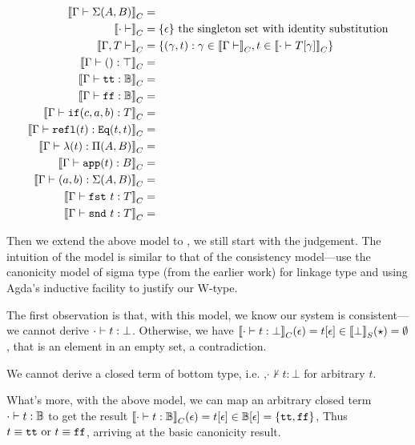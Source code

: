 \begin{align*}
  \denotesC{\goodType{\Gm}{\TySigma{A}{B}}{}} &= \\
  \denotesC{\goodCtx{\cdot}{}} &= \{\SubstEmp\} \text{  the singleton set with identity substitution} \\ 
  \denotesC{\goodCtx{\Gm, T}{}} &= \{ (\gamma , t) : \gamma \in \denotesC{\goodCtx{\Gm}{}}, t \in \denotesC{\goodType{\cdot}{\sub{T}{\gm}}{}}  \} \\
  \denotesC{\goodTerm{\Gm}{\unit}{\top}} &= \\
  \denotesC{\goodTerm{\Gm}{\true}{\cB}} &= \\
  \denotesC{\goodTerm{\Gm}{\false}{\cB}} &= \\
  \denotesC{\goodTerm{\Gm}{\ifb{c}{a}{b}}{T}} &= \\
  \denotesC{\goodTerm{\Gm}{\eqrefl{t}}{\TyId{t}{t}}} &= \\
  \denotesC{\goodTerm{\Gm}{\lam{t}}{\TyPi{A}{B}}} &= \\
  \denotesC{\goodTerm{\Gm}{\app{t}}{B}} &= \\
  \denotesC{\goodTerm{\Gm}{\pair{a}{b}}{\TySigma{A}{B}}} &= \\
  \denotesC{\goodTerm{\Gm}{\fst{t}}{T}} &= \\
  \denotesC{\goodTerm{\Gm}{\snd{t}}{T}} &= \\
\end{align*}

Then we extend the above model to \TT , we still start with the judgement.
The intuition of the model is similar to that of the consistency model---use the canonicity model of sigma type (from the earlier work) for linkage type and using Agda's inductive facility to justify our W-type. 

The first observation is that, with this model, we know our system is consistent---we cannot derive $\goodTerm{\cdot}{t}{\bot}$. Otherwise, we have $\denotesC{\goodTerm{\cdot}{t}{\bot}}(\SubstEmp) = \sub{t}{\SubstEmp} \in \denotesS{\bot}(\star) = \emptyset$, that is an element in an empty set, a contradiction.

\begin{theorem}[Consistency]
  We cannot derive a closed term of bottom type, i.e. ,$\cdot \not \vdash t : \bot$ for arbitrary $t$.
\end{theorem}

What's more, with the above model, we can map an arbitrary closed term $\goodTerm{\cdot}{t}{\cB}$ to get the result $\denotesC{\goodTerm{\cdot}{t}{\cB}}(\SubstEmp) = \sub{t}{\SubstEmp} \in \sub{\cB}{\SubstEmp} = \{\true, \false\}$, Thus $t \equiv \true \text{ or } t \equiv\false$, arriving at the basic canonicity result.


